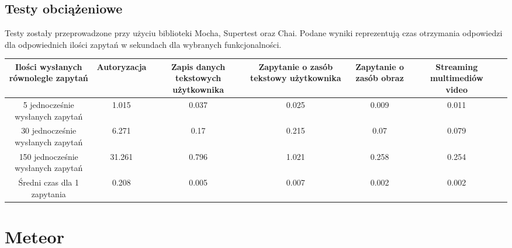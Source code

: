 \documentclass[12pt]{report}
\begin{document}
    \subsection{Testy obciążeniowe}
      Testy zostały przeprowadzone przy użyciu biblioteki Mocha, Supertest oraz Chai.
      Podane wyniki reprezentują czas otrzymania odpowiedzi dla odpowiednich ilości zapytań w sekundach dla wybranych funkcjonalności.
      \newline
      \newline
      \newline
      \newline
      \newline
      \newline
      \newline
      \newline
      \newline
      \newline
      \newline
      \newline
      \begingroup
        \renewcommand{\arraystretch}{3.5}
        \begin{adjustbox}{center}
          \begin{tabular}{|c|c|c|c|c|c|p{2.0cm}}
            \hline
            \parbox{2.0cm}{Ilości wysłanych równolegle zapytań} & 
            \parbox{2.0cm}{Autoryzacja} & 
            \parbox{2.0cm}{Zapis danych tekstowych użytkownika} & 
            \parbox{2.0cm}{Zapytanie o zasób tekstowy użytkownika} & 
            \parbox{2.0cm}{Zapytanie o zasób obraz} & 
            \parbox{2.0cm}{Streaming multimediów video} \\
            \hline
            \parbox{2.0cm}{5 jednocześnie wysłanych zapytań} & 1.015 & 0.037 & 0.025 & 0.009 & 0.011 \\
            \hline
            \parbox{2.0cm}{30 jednocześnie wysłanych zapytań} & 6.271 & 0.17 & 0.215 & 0.07 & 0.079 \\
            \hline
            \parbox{2.0cm}{150 jednocześnie wysłanych zapytań} & 31.261 & 0.796 & 1.021 & 0.258 & 0.254 \\
            \hline
            \parbox{2.0cm}{Średni czas dla 1 zapytania} & 0.208 & 0.005 & 0.007 & 0.002 & 0.002 \\
            \hline
          \end{tabular}
        \end{adjustbox}
      \endgroup

  \pagebreak
  \section{Meteor}
\end{document}
